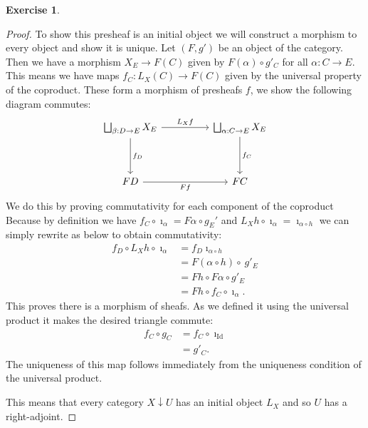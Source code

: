 \documentclass{article}
\DeclareMathOperator{\Id}{Id}
\theoremstyle{definition}
\newtheorem{question}{Exercise}
\begin{document}
\begin{question}
\begin{enumerate}[(a)]
\begin{proof}
                  To show this presheaf is an initial object we will construct a
                  morphism to every object and show it is unique. Let \((F,g')\)
                  be an object of the category. Then we have a morphism
                  \(X_{E}\to F(C)\) given by \(F(\alpha)\circ g'_{C}\) for all
                  \(\alpha:C\to E\). This means we have maps \(f_{C}:L_{X}(C)\to
                  F(C)\) given by the universal property of the coproduct. These
                  form a morphism of presheafs \(f\), we show the following
                  diagram commutes:
                  \[
                      \begin{tikzcd}[ampersand replacement=\&]
                          {\bigsqcup_{\beta:D\to E}X_{E}} \&\& {\bigsqcup_{\alpha:C\to E}X_{E}} \\
                          \\
                          FD \&\& FC
                          \arrow["{f_{D}}", from=1-1, to=3-1]
                          \arrow["{f_{C}}", from=1-3, to=3-3]
                          \arrow["{L_{X}f}", from=1-1, to=1-3]
                          \arrow["Ff"', from=3-1, to=3-3]
                      \end{tikzcd}
                  \]
                  We do this by proving commutativity for each component of the
                  coproduct Because by definition we have
                  \(f_{C}\circ\imath_{\alpha}=F\alpha\circ g_{E}'\) and
                  \(L_{X}h\circ\imath_{\alpha}=\imath_{\alpha\circ h}\) we can
                  simply rewrite as below to obtain commutativity:
                  \begin{align*}
                      f_{D}\circ L_{X}h\circ\imath_{\alpha} & =f_{D}\imath_{\alpha\circ h}         \\
                                                            & =F(\alpha\circ h)\circ\ g'_{E}       \\
                                                            & =Fh\circ F\alpha\circ g'_{E}         \\
                                                            & =Fh\circ f_{C}\circ \imath_{\alpha}.
                  \end{align*}
                  This proves there is a morphism of sheafs. As we defined it
                  using the universal product it makes the desired triangle
                  commute:
                  \begin{align*}
                      f_{C}\circ g_{C} & =f_{C}\circ\imath_{\Id} \\
                                       & =g'_{C}.
                  \end{align*}
                  The uniqueness of this map follows immediately from the
                  uniqueness condition of the universal product.

                  This means that every category \(X\downarrow U\) has an
                  initial object \(L_{X}\) and so \(U\) has a right-adjoint.
              \end{proof}
    \end{enumerate}
\end{question}
\end{document}
